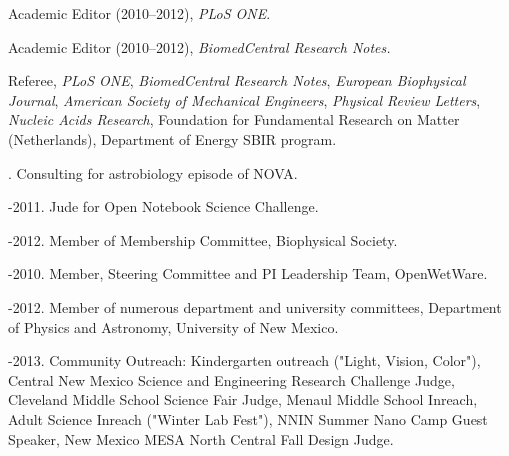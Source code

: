 \documentclass[11pt]{article}
\begin{document}
\medskip

\ind Academic Editor (2010–2012), \emph{PLoS ONE}.

\ind Academic Editor (2010–2012), \emph{BiomedCentral Research Notes.}

\ind Referee, \emph{PLoS ONE}, \emph{BiomedCentral Research Notes},
\emph{European Biophysical Journal}, \emph{American Society of Mechanical Engineers}, \emph{Physical Review Letters}, \emph{Nucleic Acids Research}, Foundation for Fundamental Research on Matter (Netherlands), Department of Energy SBIR program.

. Consulting for astrobiology episode of NOVA.

-2011. Jude for Open Notebook Science Challenge.

-2012. Member of Membership Committee, Biophysical Society.

-2010. Member, Steering Committee and PI Leadership Team, OpenWetWare. 

-2012. Member of numerous department and university committees, Department of Physics and Astronomy, University of New Mexico.

-2013. Community Outreach: Kindergarten outreach ("Light, Vision, Color"), Central New Mexico Science and Engineering Research Challenge Judge, Cleveland Middle School Science Fair Judge, Menaul Middle School Inreach, Adult Science Inreach ("Winter Lab Fest"), NNIN Summer Nano Camp Guest Speaker, New Mexico MESA North Central Fall Design Judge.
\end{document}
